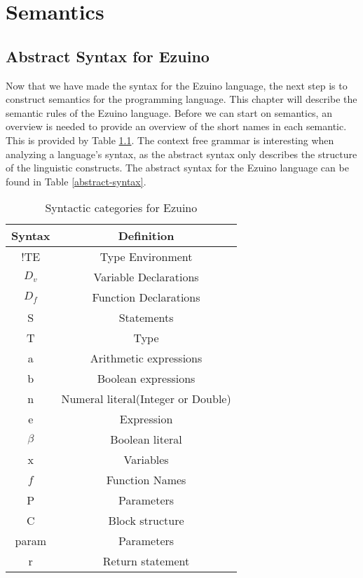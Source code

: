 \chapter{Semantics}
\label{semantics}
\section{Abstract Syntax for Ezuino}
Now that we have made the syntax for the Ezuino language, the next step is to construct semantics for the programming language. This chapter will describe the semantic rules of the Ezuino language.
Before we can start on semantics, an overview is needed to provide an overview of the short names in each semantic. This is provided by 
Table \ref{syntactic-categories}. 
The context free grammar is interesting when analyzing a language's syntax, as the abstract syntax only describes the structure of the linguistic constructs. The abstract syntax for the Ezuino language can be found in  Table \ref{abstract-syntax}.
\begin{table}[H]
\centering
\begin{tabular}{|c|c|}
\hline
\textbf{Syntax} & \textbf{Definition}   \\ \hline
!TE              & Type Environment      \\ \hline
$D_v$           & Variable Declarations \\ \hline
$D_f$           & Function Declarations \\ \hline
S               & Statements            \\ \hline
T               & Type                  \\ \hline
a               & Arithmetic expressions\\ \hline
b               & Boolean expressions   \\ \hline
n               & Numeral literal(Integer or Double) \\ \hline
e               & Expression            \\ \hline
$\beta$         & Boolean literal       \\ \hline
x               & Variables             \\ \hline
$f$             & Function Names        \\ \hline
P               & Parameters            \\ \hline
C               & Block structure       \\ \hline
param           & Parameters            \\ \hline
r               & Return statement      \\ \hline
\end{tabular}
\caption{Syntactic categories for Ezuino}
\label{syntactic-categories}
\end{table}

